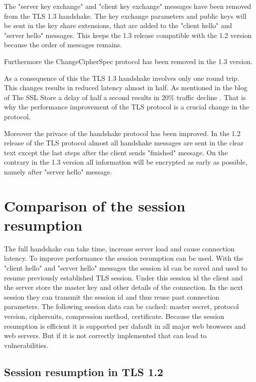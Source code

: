 The "server key exchange" and "client key exchange" messages have been removed from the TLS 1.3 handshake. The key exchange parameters and public keys will be sent in the key share extensions, that are added to the "client hello" and "server hello" messages. This keeps the 1.3 release compatible with the 1.2 version because the order of messages remains.

Furthermore the ChangeCipherSpec protocol has been removed in the 1.3 version. 

As a consequence of this the TLS 1.3 handshake involves only one round trip. This changes results in reduced latency almost in half. As mentioned in the blog of The SSL Store a delay of half a second results in 20\% traffic decline \cite{sslstore:handshake}. That is why the performance improvement of the TLS protocol is a crucial change in the protocol.

Moreover the privace of the handshake protocol has been improved. In the 1.2 release of the TLS protocol almost all handshake messages are sent in the clear text except the last steps after the client sends "finished" message. On the contrary in the 1.3 version all information will be encrypted as early as possible, namely after "server hello" message. 

\section{Comparison of the session resumption}
\label{sec:comparison_resumption}

The full handshake can take time, increase server load and cause connection latency. To improve performance the session resumption can be used. With the "client hello" and "server hello" messages the session id can be saved and used to resume previously established TLS session. Under this session id the client and the server store the master key and other details of the connection. In the next session they can transmit the session id and thus reuse past connection parameters. The following session data can be cached: master secret, protocol version, ciphersuits, compression method, certificate. Because the session resumption is efficient it is supported per dafault in all major web browsers and web servers. But if it is not correctly implemented that can lead to vulnerabilities.

\subsection{Session resumption in TLS 1.2}
\label{subsec:resumption1_2}

